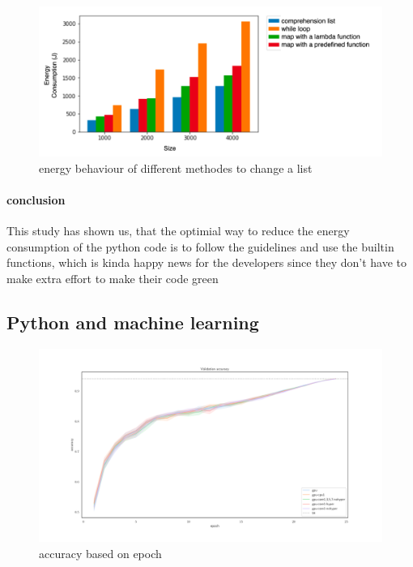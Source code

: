 \begin{figure}
    \centering
    \includegraphics[width=\linewidth]{imgs/python_treatemens}
    \caption{energy behaviour of different methodes to change a list}
    \label{fig:pythontreatement}
\end{figure}

\paragraph{conclusion}
This study has shown us, that the optimial way to reduce the energy consumption of the python code is to follow the guidelines and use the builtin functions, which is kinda happy news for the developers since they don't have to make extra effort to make their code green

\subsection{Python and machine learning }
\begin{figure}
    \centering
    \includegraphics[width=\linewidth]{imgs/accuracy_basedonepoch}
    \caption{accuracy based on epoch  }
    \label{fig:p2}
\end{figure}

